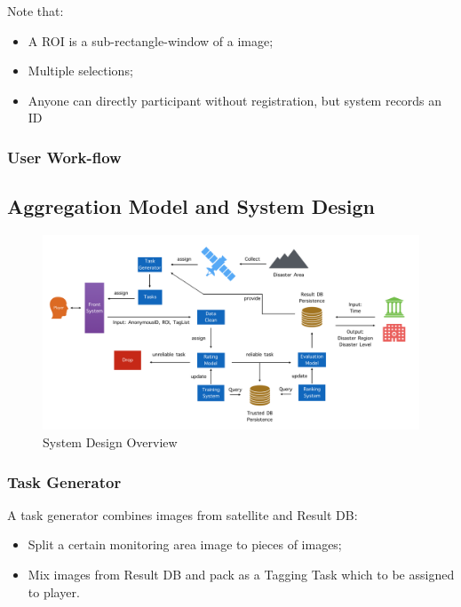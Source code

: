 \documentclass[paper=a4, fontsize=11pt]{scrartcl} %
\numberwithin{equation}{section} %
\numberwithin{figure}{section} %
\numberwithin{table}{section} %
\begin{document}
    Note that:

    \begin{itemize}
      \item A ROI is a sub-rectangle-window of a image;
      \item Multiple selections;
      \item Anyone can directly participant without registration, but system records an ID
    \end{itemize}

    \subsubsection{User Work-flow}

  \subsection{Aggregation Model and System Design}

    \begin{figure}[htp]
    \centering
    \includegraphics[width=\textwidth]{figures/system}
    \caption{System Design Overview}
    \label{fig:roiweight}
    \end{figure}

    \subsubsection{Task Generator}

    A task generator combines images from satellite and Result DB:

    \begin{itemize}
      \item Split a certain monitoring area image to pieces of images;
      \item Mix images from Result DB and pack as a Tagging Task which to be assigned to player.
    \end{itemize}
\end{document}
